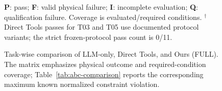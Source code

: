 \begin{figure}[t]
\noindent\scriptsize
\textcolor{TraceGreen}{\textbf{P}}: pass; \textcolor{TraceBrick}{\textbf{F}}: valid physical failure; \textcolor{TraceSlate}{\textbf{I}}: incomplete evaluation; \textcolor{TraceOchre}{\textbf{Q}}: qualification failure. Coverage is evaluated/required conditions. $^\dagger$Direct Tools passes for T03 and T05 use documented protocol variants; the strict frozen-protocol pass count is 0/11.
\caption{Task-wise comparison of LLM-only, Direct Tools, and Ours (FULL). The matrix emphasizes physical outcome and required-condition coverage; Table~\ref{tab:abc-comparison} reports the corresponding maximum known normalized constraint violation.}
\label{fig:abc-matrix}
\end{figure}